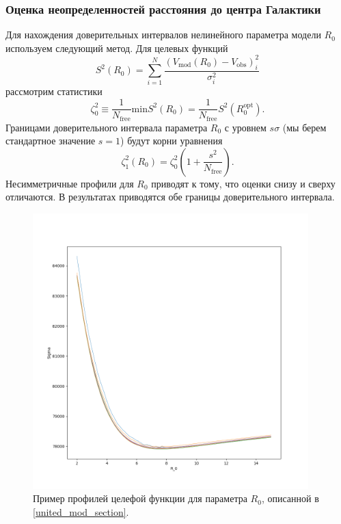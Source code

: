 \documentclass{matmex-diploma-custom}
\begin{document}
\subsubsection{Оценка неопределенностей расстояния до центра Галактики} \label{err_r0}
Для нахождения доверительных интервалов нелинейного параметра модели $R_0$ используем следующий метод. Для целевых функций
\begin{equation}
        S^2(R_0) = \sum_{i=1}^N \frac{\left(V_{\mathrm{mod}}(R_0) - V_{\mathrm{obs}} \right)^2_i}{\sigma_i^2}
\end{equation}
рассмотрим статистики 
\begin{equation}
        \zeta^2_0 \equiv \frac{1}{N_{\mathrm{free}}} \mathrm{min} S^2(R_0) = \frac{1}{N_{\mathrm{free}}} S^2(R_0^{\mathrm{opt}}).
\end{equation}
Границами доверительного интервала параметра $R_0$ с уровнем $s \sigma$ (мы берем стандартное значение $s = 1$) будут корни уравнения
\begin{equation}
        \zeta^2_1(R_0) = \zeta_0^2 \left( 1 + \frac{s^2}{N_{\mathrm{free}}} \right).
\end{equation}
Несимметричные профили для $R_0$ приводят к тому, что оценки снизу и сверху отличаются. В результатах приводятся обе границы доверительного интервала. 


\begin{figure}[h!]
        \begin{center}
\begin{minipage}[h]{0.4\linewidth}
        \includegraphics[width=0.95\textwidth]{../imgs/profiles.png}
\end{minipage}
        \caption{Пример профилей целефой функции для параметра $R_0$, описанной в \ref{united_mod_section}.}
        \end{center}
\end{figure}
\end{document}
